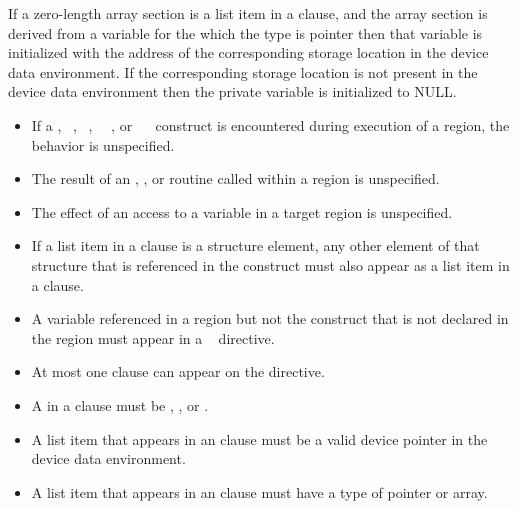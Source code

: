 {{{If a zero-length array section is a list item in a  clause, and the array section is derived from a variable for the which the type is pointer then that variable is initialized with the address of the corresponding storage location in the device data environment.  If the corresponding storage location is not present in the device data environment then the private variable is initialized to NULL.  
\ccppspecificend

\restrictions
\begin{itemize}
\item If a , ~, 
~, ~~, or 
~~ construct is encountered during
execution of a  region, the behavior is unspecified.

\item The result of an , 
, or  
routine called within a  region is unspecified.

\item The effect of an access to a  variable in a target region is 
unspecified.

\item If a list item in a  clause is a structure element, any other 
element of that structure that is referenced in the  construct 
must also appear as a list item in a  clause.

\item A variable referenced in a  region but not the  construct that is not 
declared in the  region must appear in a ~ directive. 

\item At most one  clause can appear on the directive.

\item A  in a  clause must be , ,  or .

\item A list item that appears in an  clause must be a valid device pointer in the device data environment.

\cspecificstart
\item A list item that appears in an  clause must have a type of pointer or array.
\cspecificend


\end{itemize}}}}

